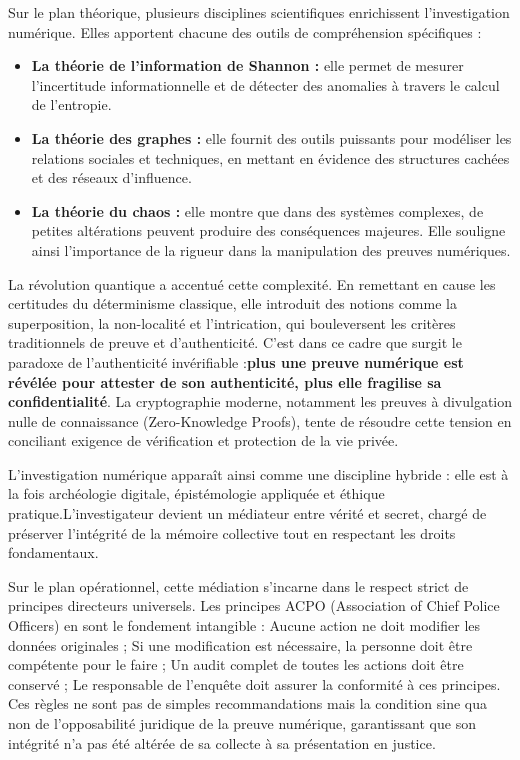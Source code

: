 \documentclass[12pt,a4paper]{report}
\begin{document}
{		\bigskip
		Sur le plan théorique, plusieurs disciplines scientifiques enrichissent l’investigation numérique.  
		Elles apportent chacune des outils de compréhension spécifiques :  
		
		\begin{itemize}
			\item \textbf{La théorie de l’information de Shannon :} elle permet de mesurer l’incertitude informationnelle et de détecter des anomalies à travers le calcul de l’entropie.  
			
			\item \textbf{La théorie des graphes :} elle fournit des outils puissants pour modéliser les relations sociales et techniques, en mettant en évidence des structures cachées et des réseaux d’influence.  
			
			\item \textbf{La théorie du chaos :} elle montre que dans des systèmes complexes, de petites altérations peuvent produire des conséquences majeures.  
			Elle souligne ainsi l’importance de la rigueur dans la manipulation des preuves numériques.  
		\end{itemize}
		    La révolution quantique a accentué cette complexité. En remettant en cause les certitudes du déterminisme classique, elle introduit des notions comme la superposition, la non-localité et l’intrication, qui bouleversent les critères traditionnels de preuve et d’authenticité. C’est dans ce cadre que surgit le paradoxe de l’authenticité invérifiable :\textbf{plus une preuve numérique est révélée pour attester de son authenticité, plus elle fragilise sa confidentialité}. La cryptographie moderne, notamment les preuves à divulgation nulle de connaissance (Zero-Knowledge Proofs), tente de résoudre cette tension en conciliant exigence de vérification et protection de la vie privée.
		
		    L’investigation numérique apparaît ainsi comme une  discipline hybride : elle est à la fois archéologie digitale, épistémologie appliquée et éthique pratique.L’investigateur devient un médiateur entre vérité et secret, chargé de préserver l’intégrité de la mémoire collective tout en respectant les droits fondamentaux.
		
		Sur le plan opérationnel, cette médiation s’incarne dans le respect strict de principes directeurs universels. Les  principes ACPO (Association of Chief Police Officers) en sont le fondement intangible : Aucune action ne doit modifier les données originales ; Si une modification est nécessaire, la personne doit être compétente pour le faire ; Un audit  complet de toutes les actions doit être conservé ;  Le responsable de l’enquête doit assurer la conformité à ces principes. Ces règles ne sont pas de simples recommandations mais la condition sine qua non de l’opposabilité juridique de la preuve numérique, garantissant que son intégrité n’a pas été altérée de sa collecte à sa présentation en justice.
		
}
\end{document}
